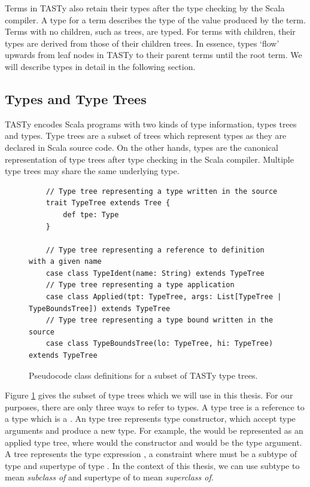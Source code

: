 Terms in TASTy also retain their types after the type checking by the Scala compiler.
A type for a term describes the type of the value produced by the term.
Terms with no children, such as  trees, are typed.  
For terms with children, their types are derived from those of their children trees.
In essence, types `flow' upwards from leaf nodes in TASTy to their parent terms until the root term.
We will describe types in detail in the following section.

\subsection{Types and Type Trees}

TASTy encodes Scala programs with two kinds of type information, types trees and types.
Type trees are a subset of trees which represent types as they are declared in Scala source code.
On the other hands, types are the canonical representation of type trees after type checking in the Scala compiler.
Multiple type trees may share the same underlying type.

\begin{figure}[!htb]
	\begin{verbatim}
	// Type tree representing a type written in the source
	trait TypeTree extends Tree {
		def tpe: Type
	}
	
	// Type tree representing a reference to definition with a given name
	case class TypeIdent(name: String) extends TypeTree 
	// Type tree representing a type application
	case class Applied(tpt: TypeTree, args: List[TypeTree | TypeBoundsTree]) extends TypeTree
	// Type tree representing a type bound written in the source
	case class TypeBoundsTree(lo: TypeTree, hi: TypeTree) extends TypeTree
	\end{verbatim} 
	\caption{Pseudocode class definitions for a subset of TASTy type trees.}
	\label{tasty:type-trees}
\end{figure}

Figure \ref{tasty:type-trees} gives the subset of type trees which we will use in this thesis.
For our purposes, there are only three ways to refer to types.
A  type tree is a reference to a type which is a .
An  type tree represents type constructor, which accept type arguments and produce a new type.
For example, the  would be represented as an applied type tree, where  would the constructor and  would be the type argument.
A  tree represents the type expression , a constraint where  must be a subtype of type  and supertype of type .
In the context of this thesis, we can use subtype to mean \textit{subclass of} and supertype of to mean \textit{superclass of}.

